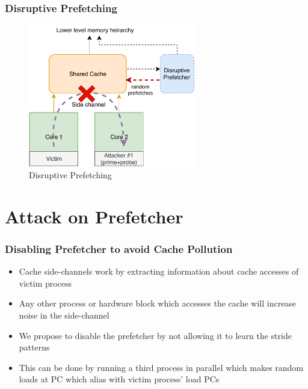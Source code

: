 \documentclass[10pt,usenames,dvipsnames]{beamer}
\begin{document}
\begin{frame}
\frametitle{Disruptive Prefetching}
\begin{figure}
\centering
\includegraphics[width=0.65\textwidth]{disruptive_prefetch}
\caption{Disruptive Prefetching}
\end{figure}
\end{frame}

\section{Attack on Prefetcher}

\begin{frame}
\frametitle{Disabling Prefetcher to avoid Cache Pollution}
\begin{itemize}
    \item Cache side-channels work by extracting information about cache
        accesses of victim process
    \item Any other process or hardware block which accesses the cache will
        increase noise in the side-channel
    \item We propose to disable the prefetcher by not allowing it to learn the stride patterns
    \item This can be done by running a third process in parallel which makes
        random loads at PC which alias with victim process' load PCs
\end{itemize}
\end{frame}
\end{document}
